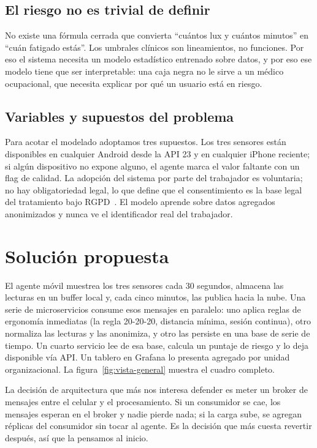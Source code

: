 \documentclass[conference]{IEEEtran}
\begin{document}
\subsection{El riesgo no es trivial de definir}

No existe una fórmula cerrada que convierta ``cuántos lux y cuántos 
minutos'' en ``cuán fatigado estás''. Los umbrales clínicos son 
lineamientos, no funciones. Por eso el sistema necesita un modelo 
estadístico entrenado sobre datos, y por eso ese modelo tiene que ser 
interpretable: una caja negra no le sirve a un médico ocupacional, que 
necesita explicar por qué un usuario está en riesgo.

\subsection{Variables y supuestos del problema}

Para acotar el modelado adoptamos tres supuestos. Los tres sensores 
están disponibles en cualquier Android desde la API 23 y en cualquier 
iPhone reciente; si algún dispositivo no expone alguno, el agente 
marca el valor faltante con un flag de calidad. La adopción del sistema 
por parte del trabajador es voluntaria; no hay obligatoriedad legal, lo 
que define que el consentimiento es la base legal del tratamiento bajo 
RGPD~\cite{gdpr2016}. El modelo aprende sobre datos agregados 
anonimizados y nunca ve el identificador real del trabajador.

\section{Solución propuesta}\label{sec:solucion}

El agente móvil muestrea los tres sensores cada 30 segundos, almacena 
las lecturas en un buffer local y, cada cinco minutos, las publica 
hacia la nube. Una serie de microservicios consume esos mensajes en 
paralelo: uno aplica reglas de ergonomía inmediatas (la regla 20-20-20, 
distancia mínima, sesión continua), otro normaliza las lecturas y las 
anonimiza, y otro las persiste en una base de serie de tiempo. Un 
cuarto servicio lee de esa base, calcula un puntaje de riesgo y lo 
deja disponible vía API. Un tablero en Grafana lo presenta agregado 
por unidad organizacional. La figura~\ref{fig:vista-general} muestra 
el cuadro completo.

La decisión de arquitectura que más nos interesa defender es meter un 
broker de mensajes entre el celular y el procesamiento. Si un 
consumidor se cae, los mensajes esperan en el broker y nadie pierde 
nada; si la carga sube, se agregan réplicas del consumidor sin tocar 
al agente. Es la decisión que más cuesta revertir después, así que la 
pensamos al inicio.
\end{document}

